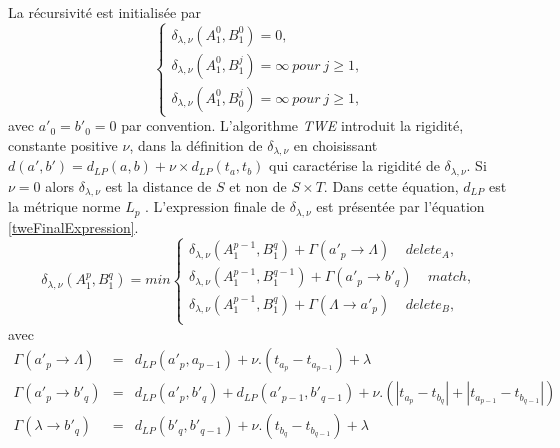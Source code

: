 La r\'ecursivit\'e est initialis\'ee par 
  \[  
 	\begin{cases}
 	\delta_{\lambda,\nu}(A_1^0, B_1^0) = 0, \\
 	\delta_{\lambda,\nu}(A_1^0, B_1^j) = \infty ~pour~ j \ge 1, \\
 	\delta_{\lambda,\nu}(A_1^0, B_0^j) = \infty ~pour~ j \ge 1,
 	\end{cases}
 \]
 avec $a'_0 = b'_0 = 0$ par convention.
 \newline
L'algorithme {\em TWE} introduit la rigidit\'e,  constante positive $\nu$, dans la d\'efinition de $\delta_{\lambda, \nu}$ en choisissant $d(a', b') = d_{LP}(a,b) + \nu \times d_{LP}(t_a,t_b)$ qui caract\'erise la rigidit\'e de $\delta_{\lambda, \nu}$.
Si $\nu = 0$ alors $\delta_{\lambda, \nu}$ est la distance de $S$ et non de $S \times T$.
Dans cette \'equation, $d_{LP}$ est la m\'etrique  norme $L_p$ \cite{chen2004marriageLpNorm}.
L'expression finale de $\delta_{\lambda, \nu}$ est pr\'esent\'ee par l'\'equation \ref{tweFinalExpression}.
\begin{equation}
	\delta_{\lambda,\nu}(A_1^p, B_1^q) = min
	\begin{cases}
		\delta_{\lambda,\nu}(A_1^{p-1}, B_1^q) + \Gamma(a'_p \rightarrow \Lambda) ~~~~~ delete_A, \\
		 \delta_{\lambda,\nu}(A_1^{p-1}, B_1^{q-1}) + \Gamma(a'_p \rightarrow b'_q) ~~~~~ match, \\
		 \delta_{\lambda,\nu}(A_1^{p-1}, B_1^q) + \Gamma(\Lambda \rightarrow a'_p) ~~~~~ delete_B, \\
	\end{cases}
	\label{tweFinalExpression}
\end{equation} 
avec 
 \[
	\begin{array}{lcl} 
	\Gamma(a'_p \rightarrow \Lambda) &=& d_{LP}(a'_p, a_{p-1}) +\nu . (t_{a_p} - t_{a_{p-1}}) +\lambda \\  
	\Gamma(a'_p \rightarrow b'_q) &=& d_{LP}(a'_p, b'_{q}) + d_{LP}(a'_{p-1}, b'_{q-1}) + \nu . ( |t_{a_p} - t_{b_{q}}| +  |t_{a_{p-1}} - t_{b_{q-1}}|)  \\ 
	\Gamma( \lambda \rightarrow b'_q) &=& d_{LP}(b'_q, b'_{q-1}) + \nu . (t_{b_q} - t_{b_{q-1}}) + \lambda
	\end{array}
\]	
